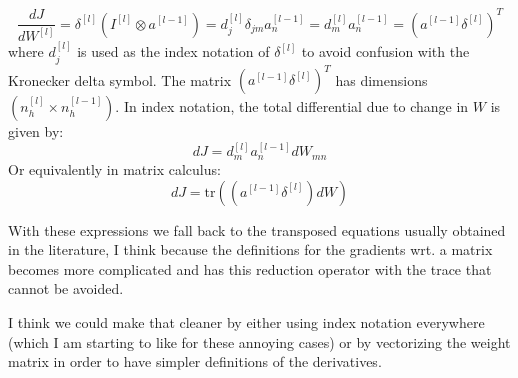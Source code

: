 \documentclass[letterpaper,12pt,oneside]{article}
\begin{document}
\begin{equation}
\frac{dJ}{dW^{[l]}} = \delta^{[l]} (I^{[l]} \otimes a^{[l-1]}) = d^{[l]}_j \delta_{jm} a_n^{[l-1]} = d^{[l]}_m a_n^{[l-1]} = (a^{[l-1]} \delta^{[l]})^T
\end{equation}
where $d^{[l]}_j$ is used as the index notation of $\delta^{[l]}$ to avoid confusion with the Kronecker delta symbol. The matrix $(a^{[l-1]} \delta^{[l]})^T$ has dimensions $(n_h^{[l]} \times n_h^{[l-1]})$.
In index notation, the total differential due to change in $W$ is given by:
\begin{equation}
dJ = d^{[l]}_m a_n^{[l-1]} dW_{mn}
\end{equation}
Or equivalently in matrix calculus:
\begin{equation}
dJ = \mathrm{tr} \left( (a^{[l-1]} \delta^{[l]}) dW \right)
\end{equation}

With these expressions we fall back to the transposed equations usually obtained in the literature, I think because the definitions for the gradients wrt. a matrix becomes more complicated and has this reduction operator with the trace that cannot be avoided.

I think we could make that cleaner by either using index notation everywhere (which I am starting to like for these annoying cases) or by vectorizing the weight matrix in order to have simpler definitions of the derivatives.
\end{document}
